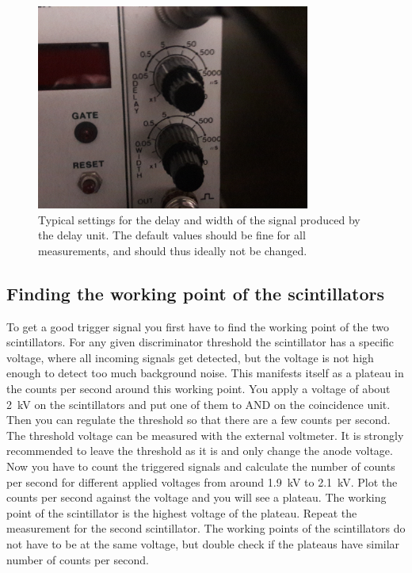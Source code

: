\documentclass[12pt]{article}
\begin{document}
\begin{figure}[H]
    \centering
    \includegraphics[width = 9cm]{pics/delay_unit.jpg}
    \caption{\small Typical settings for the delay and width of the signal produced by the delay unit. The default values should be fine for all measurements, and should thus ideally not be changed.}
    \label{fig:delay_unit}
\end{figure}

\subsection{Finding the working point of the scintillators}
To get a good trigger signal you first have to find the working point of the two scintillators. For any given discriminator threshold the scintillator has a specific voltage, where all incoming signals get detected, but the voltage is not high enough to detect too much background noise. This manifests itself as a plateau in the counts per second around this working point. You apply a voltage of about \SI{2}{\kilo\volt} on the scintillators and put one of them to AND on the coincidence unit. Then you can regulate the threshold so that there are a few counts per second. The threshold voltage can be measured with the external voltmeter. It is strongly recommended to leave the threshold as it is and only change the anode voltage. Now you have to count the triggered signals and calculate the number of counts per second for different applied voltages from around \SI{1.9}{\kilo\volt} to \SI{2.1}{\kilo\volt}. Plot the counts per second against the voltage and you will see a plateau. The working point of the scintillator is the highest voltage of the plateau. Repeat the measurement for the second scintillator. The working points of the scintillators do not have to be at the same voltage, but double check if the plateaus have similar number of counts per second.
\end{document}
